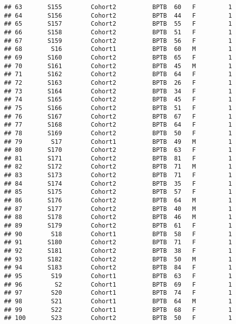 \documentclass[
]{article}
\begin{document}
\begin{verbatim}
## 63       S155        Cohort2          BPTB  60   F         1      
## 64       S156        Cohort2          BPTB  44   F         1      
## 65       S157        Cohort2          BPTB  55   F         1      
## 66       S158        Cohort2          BPTB  51   F         1      
## 67       S159        Cohort2          BPTB  56   F         1      
## 68        S16        Cohort1          BPTB  60   M         1      
## 69       S160        Cohort2          BPTB  65   F         1      
## 70       S161        Cohort2          BPTB  45   M         1      
## 71       S162        Cohort2          BPTB  64   F         1      
## 72       S163        Cohort2          BPTB  26   F         1      
## 73       S164        Cohort2          BPTB  34   F         1      
## 74       S165        Cohort2          BPTB  45   F         1      
## 75       S166        Cohort2          BPTB  51   F         1      
## 76       S167        Cohort2          BPTB  67   F         1      
## 77       S168        Cohort2          BPTB  64   F         1      
## 78       S169        Cohort2          BPTB  50   F         1      
## 79        S17        Cohort1          BPTB  49   M         1      
## 80       S170        Cohort2          BPTB  63   F         1      
## 81       S171        Cohort2          BPTB  81   F         1      
## 82       S172        Cohort2          BPTB  71   M         1      
## 83       S173        Cohort2          BPTB  71   F         1      
## 84       S174        Cohort2          BPTB  35   F         1      
## 85       S175        Cohort2          BPTB  57   F         1      
## 86       S176        Cohort2          BPTB  64   M         1      
## 87       S177        Cohort2          BPTB  40   M         1      
## 88       S178        Cohort2          BPTB  46   M         1      
## 89       S179        Cohort2          BPTB  61   F         1      
## 90        S18        Cohort1          BPTB  58   F         1      
## 91       S180        Cohort2          BPTB  71   F         1      
## 92       S181        Cohort2          BPTB  38   F         1      
## 93       S182        Cohort2          BPTB  50   M         1      
## 94       S183        Cohort2          BPTB  84   F         1      
## 95        S19        Cohort1          BPTB  63   F         1      
## 96         S2        Cohort1          BPTB  69   F         1      
## 97        S20        Cohort1          BPTB  74   F         1      
## 98        S21        Cohort1          BPTB  64   M         1      
## 99        S22        Cohort1          BPTB  68   F         1      
## 100       S23        Cohort2          BPTB  50   F         1      

\end{verbatim}
\end{document}

